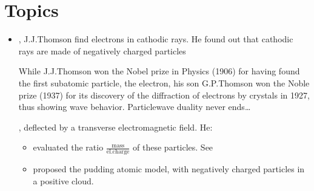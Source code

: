 \documentclass[letterpaper,10pt,english]{jupyterBook}
\begin{document}
\sphinxstepscope


\section{Topics}
\label{\detokenize{ch/quantum-mechanics/history/topics:topics}}\label{\detokenize{ch/quantum-mechanics/history/topics:quantum-mechanics-history-topics}}\label{\detokenize{ch/quantum-mechanics/history/topics::doc}}
\sphinxAtStartPar
{}
\begin{itemize}
\item {} 
, J.J.Thomson find electrons in cathodic rays. He found out that cathodic rays are made of negatively charged particles%
\begin{footnote}[1]\sphinxAtStartFootnote
While J.J.Thomson won the Nobel prize in Physics (1906) for having found the first sub\sphinxhyphen{}atomic particle, the electron, his son G.P.Thomson won the Noble prize (1937) for its discovery of the diffraction of electrons by crystals in 1927, thus showing wave behavior. Particle\sphinxhyphen{}wave duality never ends…
%
\end{footnote}, deflected by a transverse electromagnetic field. He:
\begin{itemize}
\item {} 
\sphinxAtStartPar
evaluated the ratio \(\frac{\text{mass}}{\text{el.charge}}\) of these particles. See 

\item {} 
\sphinxAtStartPar
proposed the pudding atomic model, with negatively charged particles in a positive cloud.

\end{itemize}

\end{itemize}
\end{document}
